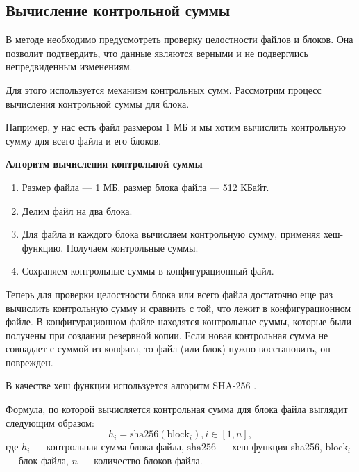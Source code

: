 \newpage

\subsection{Вычисление контрольной суммы}

В методе необходимо предусмотреть проверку целостности файлов и блоков. Она позволит подтвердить, что данные являются верными и не подверглись непредвиденным изменениям.

Для этого используется механизм контрольных сумм. 
Рассмотрим процесс вычисления контрольной суммы для блока.


Например, у нас есть файл размером 1 МБ и мы хотим вычислить контрольную сумму для всего файла и его блоков.
\begin{flushleft}
\textbf{Алгоритм вычисления контрольной суммы}
\end{flushleft}
\begin{enumerate}
\item Размер файла --- 1 МБ, размер блока файла --- 512 КБайт.

\item Делим файл на два блока.

\item Для файла и каждого блока вычисляем контрольную сумму, применяя хеш-функцию. Получаем контрольные суммы.

\item Сохраняем контрольные суммы в конфигурационный файл.
\end{enumerate}


Теперь для проверки целостности блока или всего файла достаточно еще раз вычислить контрольную сумму и сравнить с той, что лежит в конфигурационном файле. В конфигурационном файле находятся контрольные суммы, которые были получены при создании резервной копии. Если новая контрольная сумма не совпадает с суммой из конфига, то файл (или блок) нужно восстановить, он поврежден.  

В качестве хеш функции используется алгоритм SHA-256 \cite{sha256}.  

Формула, по которой вычисляется контрольная сумма для блока файла выглядит следующим образом:
\begin{equation}
\label{eq:checksum_block}
h_{i} = \mathrm{sha256}(\mathrm{block}_i), i \in [1,n],
\end{equation}
где $h_{i}$ --- контрольная сумма блока файла, $\mathrm{sha256}$ --- хеш-функция sha256, $\mathrm{block}_i$ --- блок файла, $n$ --- количество блоков файла.  


